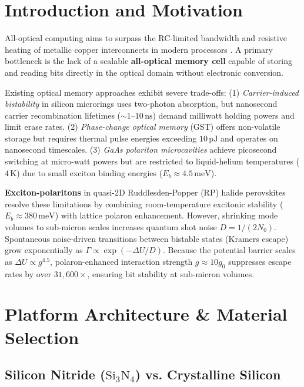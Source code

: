 \documentclass[10pt, conference]{IEEEtran}
\begin{document}
\section{Introduction and Motivation}

All-optical computing aims to surpass the RC-limited bandwidth and resistive heating of metallic copper interconnects in modern processors \cite{miller_photonics}. A primary bottleneck is the lack of a scalable \textbf{all-optical memory cell} capable of storing and reading bits directly in the optical domain without electronic conversion.

Existing optical memory approaches exhibit severe trade-offs:
(1) \textit{Carrier-induced bistability} in silicon microrings uses two-photon absorption, but nanosecond carrier recombination lifetimes ($\sim 1$--$10\,\text{ns}$) demand milliwatt holding powers and limit erase rates.
(2) \textit{Phase-change optical memory} (GST) offers non-volatile storage but requires thermal pulse energies exceeding $10\,\text{pJ}$ and operates on nanosecond timescales.
(3) \textit{GaAs polariton microcavities} achieve picosecond switching at micro-watt powers but are restricted to liquid-helium temperatures ($4\,\text{K}$) due to small exciton binding energies ($E_b \approx 4.5\,\text{meV}$).

\textbf{Exciton-polaritons} in quasi-2D Ruddlesden-Popper (RP) halide perovskites resolve these limitations by combining room-temperature excitonic stability ($E_b \approx 380\,\text{meV}$) with lattice polaron enhancement. However, shrinking mode volumes to sub-micron scales increases quantum shot noise $D = 1/(2N_0)$. Spontaneous noise-driven transitions between bistable states (Kramers escape) grow exponentially as $\Gamma \propto \exp(-\Delta U / D)$. Because the potential barrier scales as $\Delta U \propto g^{4.5}$, polaron-enhanced interaction strength $g \approx 10 g_0$ suppresses escape rates by over $31{,}600\times$, ensuring bit stability at sub-micron volumes.

\section{Platform Architecture \& Material Selection}

\subsection{Silicon Nitride ($\text{Si}_3\text{N}_4$) vs. Crystalline Silicon}
\end{document}
